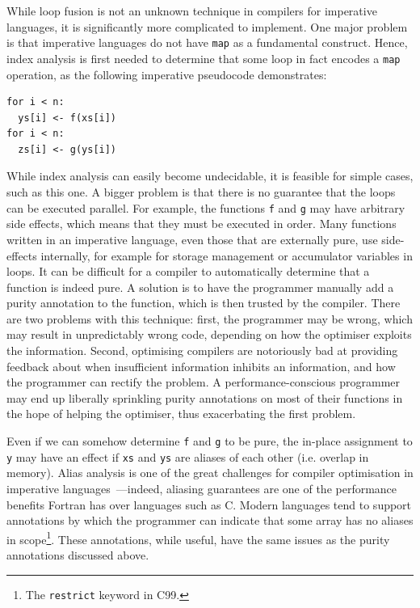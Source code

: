 
While loop fusion is not an unknown technique in compilers for
imperative languages, it is significantly more complicated to
implement.  One major problem is that imperative languages do not have
\lstinline{map} as a fundamental construct.  Hence, index analysis is
first needed to determine that some loop in fact encodes a
\lstinline{map} operation, as the following imperative pseudocode
demonstrates:

\begin{lstlisting}
for i < n:
  ys[i] <- f(xs[i])
for i < n:
  zs[i] <- g(ys[i])
\end{lstlisting}

While index analysis can easily become undecidable, it is feasible for
simple cases, such as this one.  A bigger problem is that there is no
guarantee that the loops can be executed parallel.  For example, the
functions \lstinline{f} and \lstinline{g} may have arbitrary side
effects, which means that they must be executed in order.  Many
functions written in an imperative language, even those that are
externally pure, use side-effects internally, for example for storage
management or accumulator variables in loops.  It can be difficult for
a compiler to automatically determine that a function is indeed pure.
A solution is to have the programmer manually add a purity annotation
to the function, which is then trusted by the compiler.  There are two
problems with this technique: first, the programmer may be wrong,
which may result in unpredictably wrong code, depending on how the
optimiser exploits the information.  Second, optimising compilers are
notoriously bad at providing feedback about when insufficient
information inhibits an information, and how the programmer can
rectify the problem.  A performance-conscious programmer may end up
liberally sprinkling purity annotations on most of their functions in
the hope of helping the optimiser, thus exacerbating the first
problem.

Even if we can somehow determine \lstinline{f} and \lstinline{g} to be
pure, the in-place assignment to \lstinline{y} may have an effect if
\lstinline{xs} and \lstinline{ys} are aliases of each other
(i.e. overlap in memory).  Alias analysis is one of the great
challenges for compiler optimisation in imperative
languages~\cite{hendren1992designing}---indeed, aliasing guarantees
are one of the performance benefits Fortran has over languages such as
C.  Modern languages tend to support annotations by which the
programmer can indicate that some array has no aliases in
scope\footnote{The \texttt{restrict} keyword in C99.}.  These
annotations, while useful, have the same issues as the purity
annotations discussed above.

